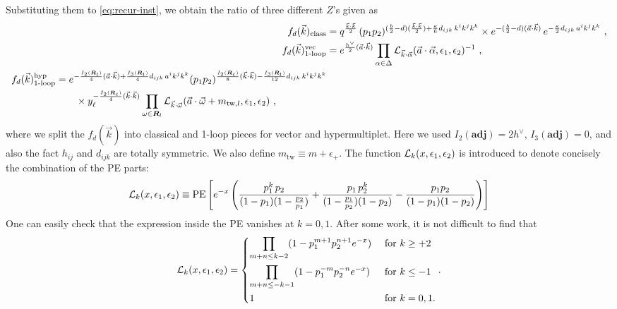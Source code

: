 \documentclass[letterpaper, 11pt]{article}
\def\CL{{\cal L}}
\def\a{\alpha}
\def\e{\epsilon}
\def\k{\kappa}
\def\w{\omega}
\def\D{\Delta}
\begin{document}
Substituting them to \eqref{eq:recur-inst}, we obtain the ratio of three different $Z$'s given as
\begin{align}
 f_d(\vec{k})_{\text{class}} &=  q^{\frac{\vec{k}\cdot\vec{k}}{2} } \, 
  (p_1p_2)^{(\frac{b}{2}-d) (\frac{\vec{k}\cdot\vec{k}}{2}) +\frac{\k}{6}d_{ijk}\,k^ik^jk^k} \times  e^{-(\frac{b}{2}-d)(\vec{a}\cdot\vec{k})}\,
  e^{-\frac{\kappa}{2}d_{ijk}\,a^ik^jk^k} \ , \\
  f_d(\vec{k})_{\text{1-loop}}^{\text{vec}}&= e^{\frac{h^\vee}{2}(\vec{a}\cdot\vec{k})}  \prod_{\a \in \D} \CL_{\vec{k} \cdot \vec{\a}} (\vec{a}\cdot\vec{\alpha}, \epsilon_1, \epsilon_2)^{-1} \ , \\
 \begin{split}
  f_d(\vec{k})_{\text{1-loop}}^{\text{hyp}} &= e^{-\frac{I_2(\boldsymbol{R}_l)}{4}(\vec{a}\cdot\vec{k})+\frac{I_3(\boldsymbol{R}_l)}{4}d_{ijk}\,a^ik^jk^k} (p_1p_2)^{\frac{I_2(\boldsymbol{R}_\ell)}{8}(\vec{k}\cdot\vec{k})-\frac{I_3(\boldsymbol{R}_l)}{12}d_{ijk}\,k^ik^jk^k} \\
   &\qquad \times   y_\ell^{-\frac{I_2(\boldsymbol{R}_\ell)}{4}(\vec{k}\cdot\vec{k})} \prod_{\w \in \boldsymbol{R}_l} \CL_{\vec{k}\cdot\vec{\w}}(\vec{a}\cdot \vec{\w} + m_{\text{tw},l}, \e_1,\e_2) \ , 
\end{split}
\end{align}
where we split the $f_d(\vec{k})$ into classical and 1-loop pieces for vector and hypermultiplet. 
Here we used $I_2(\textbf{adj}) = 2h^\vee$, $I_3(\textbf{adj})=0$, and also 
the fact $h_{ij}$ and $d_{ijk}$ are totally symmetric. We also define $m_{\text{tw}} \equiv m + \e_+$. The function $\CL_k (x,\e_1,\e_2)$ is introduced to denote concisely the combination of the PE parts:
\begin{align}
  \CL_k (x,\e_1,\e_2) \equiv \text{PE}\left[ e^{-x} \left(\frac{p_1^k \, p_2}{(1-p_1)(1-\frac{p_2}{p_1})}+\frac{p_1\, p_2^k}{(1-\frac{p_1}{p_2})(1-p_2)}-\frac{p_1p_2}{(1-p_1)(1-p_2)}\right) \right]
\end{align}
One can easily check that the expression inside the PE vanishes at $k=0, 1$. After some work, it is not difficult to find that 
\begin{align}
  \CL_k (x,\e_1,\e_2) =
   \begin{dcases}
   \prod_{m+n \le k-2}(1-p_1^{m+1} p_2^{n+1}e^{-x}) & \text{ for } k\geq +2 \\
   \prod_{m+n \le -k-1}(1-p_1^{-m} p_2^{-n}e^{-x}) & \text{ for } k\leq-1 \\
   1 & \text{ for } k=0, 1.
   \end{dcases} . 
\end{align}
\end{document}
